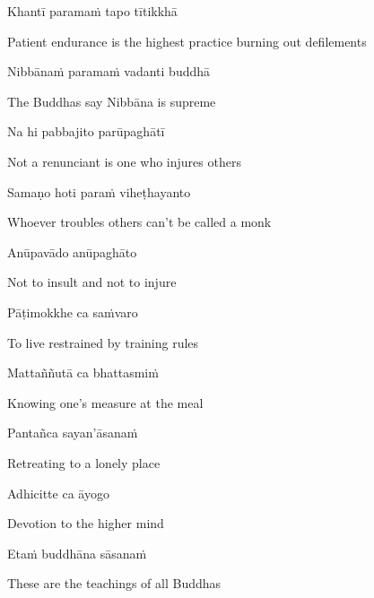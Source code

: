 Khantī paramaṁ tapo tītikkhā

\begin{english}
  Patient endurance is the highest practice burning out defilements
\end{english}

Nibbānaṁ paramaṁ vadanti buddhā

\begin{english}
  The Buddhas say Nibbāna is supreme
\end{english}

Na hi pabbajito parūpaghātī

\begin{english}
  Not a renunciant is one who injures others
\end{english}

Samaṇo hoti paraṁ viheṭhayanto

\begin{english}
  Whoever troubles others can't be called a monk
\end{english}

Anūpavādo anūpaghāto

\begin{english}
  Not to insult and not to injure
\end{english}

Pāṭimokkhe ca saṁvaro

\begin{english}
  To live restrained by training rules
\end{english}

Mattaññutā ca bhattasmiṁ

\begin{english}
  Knowing one's measure at the meal
\end{english}

Pantañca sayan'āsanaṁ

\begin{english}
  Retreating to a lonely place
\end{english}

Adhicitte ca āyogo

\begin{english}
  Devotion to the higher mind
\end{english}

Etaṁ buddhāna sāsanaṁ

\begin{english}
  These are the teachings of all Buddhas
\end{english}

\suttaRef{[Dhp 183-185]}

